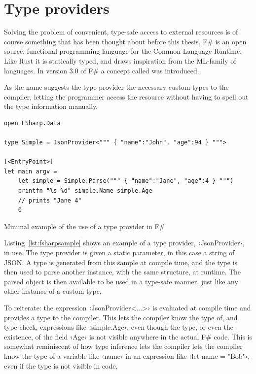 \section{Type providers}
\label{sec:type-providers}

Solving the problem of convenient, type-safe access to external resources is of course something that has been thought about before this thesis. F\# is an open source, functional programming language for the Common Language Runtime. Like Rust it is statically typed, and draws inspiration from the ML-family of languages. In version 3.0 of F\# a concept called  was introduced.

As the name suggests the type provider  the necessary custom types to the compiler, letting the programmer access the resource without having to spell out the type information manually.

\begin{listing}[ht!]
\begin{verbatim}
open FSharp.Data

type Simple = JsonProvider<""" { "name":"John", "age":94 } """>

[<EntryPoint>]
let main argv =
    let simple = Simple.Parse(""" { "name":"Jane", "age":4 } """)
    printfn "%s %d" simple.Name simple.Age
    // prints "Jane 4"
    0
\end{verbatim}
\caption{Minimal example of the use of a type provider in F\#}
\label{lst:fsharpsample}
\end{listing}

Listing~\ref{lst:fsharpsample} shows an example of a type provider, ‹JsonProvider›, in use. The type provider is given a static parameter, in this case a string of JSON. A type is generated from this sample at compile time, and the type is then used to parse another instance, with the same structure, at runtime. The parsed object is then available to be used in a type-safe manner, just like any other instance of a custom type.

To reiterate: the expression ‹JsonProvider<...>› is evaluated at compile time and provides a type to the compiler. This lets the compiler know the type of, and type check, expressions like ‹simple.Age›, even though the type, or even the existence, of the field ‹Age› is not visible anywhere in the actual F\# code. This is somewhat reminiscent of how type inference lets the compiler lets the compiler know the type of a variable like ‹name› in an expression like ‹let name = "Bob"›, even if the type is not visible in code.

